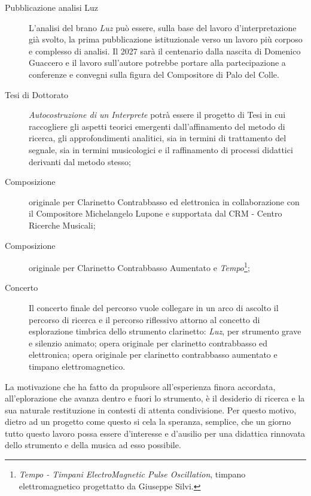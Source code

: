 \documentclass{gs-adonis}
\begin{document}
\begin{description}
  \item[Pubblicazione analisi Luz] L'analisi del brano \emph{Luz} può essere,
    sulla base del lavoro d'interpretazione già svolto, la prima pubblicazione
    istituzionale verso un lavoro più corposo e complesso di analisi. Il 2027
    sarà il centenario dalla nascita di Domenico Guaccero e il lavoro
    sull'autore potrebbe portare alla partecipazione a conferenze e convegni
    sulla figura del Compositore di Palo del Colle.
  \item[Tesi di Dottorato] \emph{Autocostruzione di un Interprete} potrà essere il
    progetto di Tesi in cui raccogliere gli aspetti teorici emergenti
    dall'affinamento del metodo di ricerca, gli approfondimenti analitici, sia
    in termini di trattamento del segnale, sia in termini musicologici e il
    raffinamento di processi didattici derivanti dal metodo stesso;
  \item[Composizione] originale per Clarinetto Contrabbasso ed elettronica in
    collaborazione con il Compositore Michelangelo Lupone e supportata dal
    CRM - Centro Ricerche Musicali;
  \item[Composizione] originale per Clarinetto Contrabbasso Aumentato e
    \emph{Tempo}\footnote{%
  \emph{Tempo - Timpani ElectroMagnetic Pulse Oscillation}, timpano
  elettromagnetico progettatto da Giuseppe Silvi.
  };
  \item[Concerto] Il concerto finale del percorso vuole collegare in un arco di
    ascolto il percorso di ricerca e il percorso riflessivo attorno al concetto di
    esplorazione timbrica dello strumento clarinetto: \emph{Luz}, per strumento
    grave e silenzio animato; opera originale per clarinetto contrabbasso ed
    elettronica; opera originale per clarinetto contrabbasso aumentato e timpano
    elettromagnetico.
\end{description}


La motivazione che ha fatto da propulsore all'esperienza finora accordata,
all'eplorazione che avanza dentro e fuori lo strumento, è il desiderio di
ricerca e la sua naturale restituzione in contesti di attenta condivisione. Per
questo motivo, dietro ad un progetto come questo si cela la speranza, semplice,
che un giorno tutto questo lavoro possa essere d'interesse e d'ausilio per una
didattica rinnovata dello strumento e della musica ad esso possibile.
\end{document}
